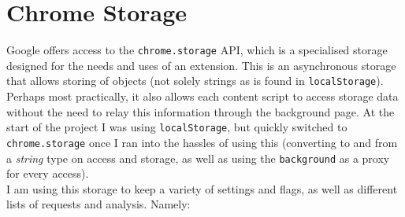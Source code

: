 \section{Chrome Storage} \label{storageSpecs}

Google offers access to the \texttt{chrome.storage} API, which is a specialised storage designed for the needs and uses of an extension. This is an asynchronous storage that allows storing of objects (not solely strings as is found in \texttt{localStorage}). Perhaps most practically, it also allows each content script to access storage data without the need to relay this information through the background page. At the start of the project I was using \texttt{localStorage}, but quickly switched to \texttt{chrome.storage} once I ran into the hassles of using this (converting to and from a \textit{string} type on access and storage, as well as using the \texttt{background} as a proxy for every access). \\

I am using this storage to keep a variety of settings and flags, as well as different lists of requests and analysis. Namely: 

